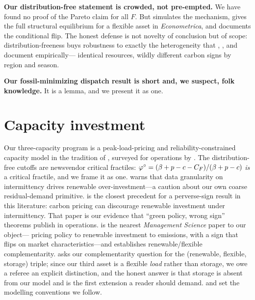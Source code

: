 \documentclass[11pt,reqno]{amsart}
\begin{document}
\textbf{Our distribution-free statement is crowded, not pre-empted.} We have found no proof
of the Pareto claim for all $F$. But \citet{vanderJagt2024} simulates the mechanism,
\citet{Butters2025} gives the full structural equilibrium for a flexible asset in
\emph{Econometrica}, and \citet{HittingerAzevedo2015} documents the conditional flip. The
honest defense is not novelty of conclusion but of scope: distribution-freeness buys
robustness to exactly the heterogeneity that \citet{Novan2015},
\citet{CallawayFowlieMcCormick2018}, and \citet{Menati2023aae} document empirically---
identical resources, wildly different carbon signs by region and season.

\textbf{Our fossil-minimizing dispatch result is short and, we suspect, folk knowledge.} It
is a lemma, and we present it as one.

\section{Capacity investment}
Our three-capacity program is a peak-load-pricing and reliability-constrained capacity model
in the tradition of \citet{CrewKleindorfer1976}, surveyed for operations by
\citet{VanMieghem2003}. The distribution-free cutoffs are newsvendor critical fractiles:
$\varphi^{\circ}=(\beta+p-c-C_F)/(\beta+p-c)$ \emph{is} a critical fractile, and we frame it as one.
\citet{Hu2015} warns that data granularity on intermittency drives renewable
over-investment---a caution about our own coarse residual-demand primitive.
\citet{AflakiNetessine2017} is the closest precedent for a perverse-sign result in this
literature: carbon pricing can discourage renewable investment under intermittency. That
paper is our evidence that ``green policy, wrong sign'' theorems publish in operations.
\citet{KokShangYucel2018} is the nearest \emph{Management Science} paper to our object---
pricing policy to renewable investment to emissions, with a sign that flips on market
characteristics---and \citet{KokShangYucel2020} establishes renewable/flexible
complementarity. \citet{PengWuSouza2024} asks our complementarity question for the
(renewable, flexible, storage) triple; since our third asset is a flexible \emph{load}
rather than storage, we owe a referee an explicit distinction, and the honest answer is
that storage is absent from our model and is the first extension a reader should demand.
\citet{SunarBirge2019} and \citet{Drake2016} set the modelling conventions we follow.
\end{document}
